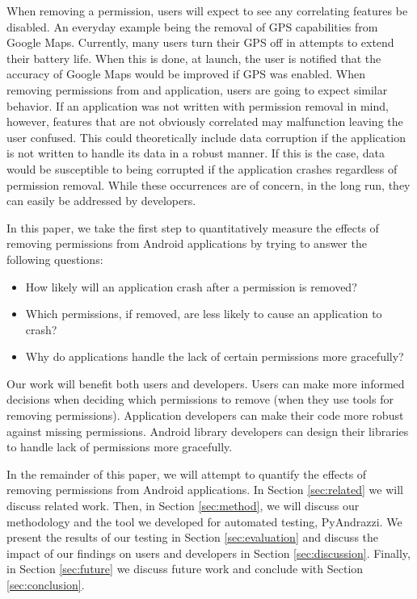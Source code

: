 When removing a permission, users will expect to see any correlating features be disabled. An everyday example being the removal of GPS capabilities from Google Maps. Currently, many users turn their GPS off in attempts to extend their battery life. When this is done, at launch, the user is notified that the accuracy of Google Maps would be improved if GPS was enabled.  When removing permissions from and application, users are going to expect similar behavior. If an application was not written with permission removal in mind, however, features that are not obviously correlated may malfunction leaving the user confused. This could theoretically include data corruption if the application is not written to handle its data in a robust manner. If this is the case, data would be susceptible to being corrupted if the application crashes regardless of permission removal. While these occurrences are of concern, in the long run, they can easily be addressed by developers.

In this paper, we take the first step to quantitatively measure the effects of removing permissions from Android applications by trying to answer the following questions:

\begin{itemize}
\item How likely will an application crash after a permission is removed?

\item Which permissions, if removed, are less likely to cause an application to crash?

\item Why do applications handle the lack of certain permissions more gracefully?

\end{itemize}

Our work will benefit both users and developers.  Users can make more informed decisions when deciding which permissions to remove (when they use tools for removing permissions).  Application developers can make their code more robust against missing permissions.  Android library developers can design their libraries to handle lack of permissions more gracefully.
	
In the remainder of this paper, we will attempt to quantify the effects of removing permissions from Android applications. In Section \ref{sec:related} we will discuss related work. Then, in Section \ref{sec:method}, we will discuss our methodology and the tool we developed for automated testing, PyAndrazzi. We present the results of our testing in Section \ref{sec:evaluation} and discuss the impact of our findings on users and developers in Section \ref{sec:discussion}. Finally, in Section \ref{sec:future} we discuss future work and conclude with Section \ref{sec:conclusion}. 
